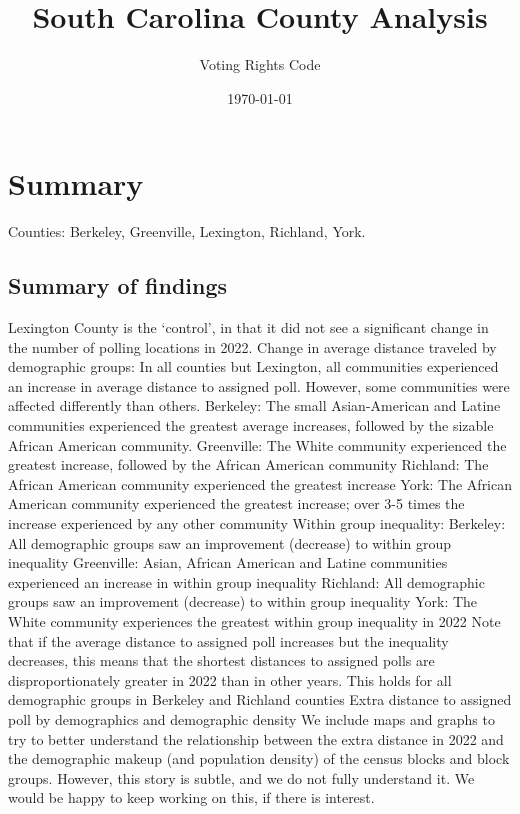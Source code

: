 \documentclass[11pt]{article}
\title{South Carolina County Analysis}
\author{Voting Rights Code}
\date{\today}
\theoremstyle{remark}
\theoremstyle{definition}
\begin{document}
\maketitle
\section{Summary}
	
	Counties: Berkeley, Greenville, Lexington, Richland, York.
\subsection{Summary of findings}

\begin{outline}
	\1 Lexington County is the `control', in that it did not see a significant change in the number of polling locations in 2022.
	\1 Change in average distance traveled by demographic groups:
		\2 In all counties but Lexington, all communities experienced an increase in average distance to assigned poll. However, some communities were affected differently than others. 
		\2 Berkeley: The small Asian-American and Latine communities experienced the greatest average increases, followed by the sizable African American community.
		\2 Greenville: The White community experienced the greatest increase, followed by the African American community
		\2 Richland: The African American community experienced the greatest increase
		\2 York: The African American community experienced the greatest increase; over 3-5 times the increase experienced by any other community
	\1 Within group inequality:
		\2 Berkeley: All demographic groups saw an improvement (decrease) to within group inequality
		\2 Greenville: Asian, African American and Latine communities experienced an increase in within group inequality
		\2 Richland: All demographic groups saw an improvement (decrease) to within group inequality
		\2 York: The White community experiences the greatest within group inequality in 2022
	\1 Note that if the average distance to assigned poll increases but the inequality decreases, this means that the shortest distances to assigned polls are disproportionately greater in 2022 than in other years. 
		\2 This holds for all demographic groups in Berkeley and Richland counties
	\1 Extra distance to assigned poll by demographics and demographic density
		\2 We include maps and graphs to try to better understand the relationship between the extra distance in 2022 and the demographic makeup (and population density) of the census blocks and block groups. However, this story is subtle, and we do not fully understand it. We would be happy to keep working on this, if there is interest.
\end{outline}
	
\end{document}
